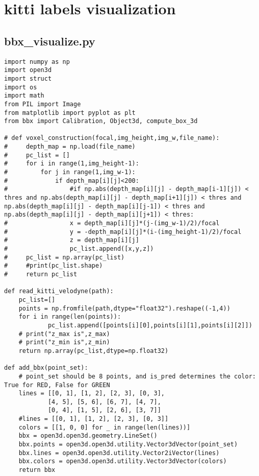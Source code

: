 \section*{kitti labels visualization}
\subsection*{bbx\_visualize.py}
\begin{verbatim}
import numpy as np
import open3d
import struct
import os
import math
from PIL import Image
from matplotlib import pyplot as plt
from bbx import Calibration, Object3d, compute_box_3d

# def voxel_construction(focal,img_height,img_w,file_name):
#     depth_map = np.load(file_name)
#     pc_list = []
#     for i in range(1,img_height-1):
#         for j in range(1,img_w-1):
#             if depth_map[i][j]<200:
#                 #if np.abs(depth_map[i][j] - depth_map[i-1][j]) < thres and np.abs(depth_map[i][j] - depth_map[i+1][j]) < thres and np.abs(depth_map[i][j] - depth_map[i][j-1]) < thres and np.abs(depth_map[i][j] - depth_map[i][j+1]) < thres:
#                 x = depth_map[i][j]*(j-(img_w-1)/2)/focal
#                 y = -depth_map[i][j]*(i-(img_height-1)/2)/focal
#                 z = depth_map[i][j]
#                 pc_list.append([x,y,z])
#     pc_list = np.array(pc_list)
#     #print(pc_list.shape)
#     return pc_list

def read_kitti_velodyne(path):
    pc_list=[]
    points = np.fromfile(path,dtype="float32").reshape((-1,4))
    for i in range(len(points)):
            pc_list.append([points[i][0],points[i][1],points[i][2]])
    # print("z_max is",z_max)
    # print("z_min is",z_min)       
    return np.array(pc_list,dtype=np.float32)

def add_bbx(point_set):
    # point_set should be 8 points, and is_pred determines the color: True for RED, False for GREEN
    lines = [[0, 1], [1, 2], [2, 3], [0, 3],
            [4, 5], [5, 6], [6, 7], [4, 7],
            [0, 4], [1, 5], [2, 6], [3, 7]]
    #lines = [[0, 1], [1, 2], [2, 3], [0, 3]]
    colors = [[1, 0, 0] for _ in range(len(lines))]
    bbx = open3d.open3d.geometry.LineSet()
    bbx.points = open3d.open3d.utility.Vector3dVector(point_set)
    bbx.lines = open3d.open3d.utility.Vector2iVector(lines)
    bbx.colors = open3d.open3d.utility.Vector3dVector(colors)
    return bbx


\end{verbatim}

